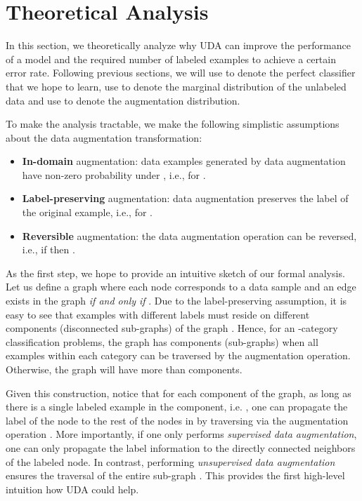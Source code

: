 \documentclass{article}
\def\name{UDA\xspace}
\begin{document}
\vspace{-0.5em}
\section{Theoretical Analysis}
\vspace{-0.5em}
\label{sec:theory}
In this section, we theoretically analyze why \name can improve the performance of a model and the required number of labeled examples to achieve a certain error rate.
Following previous sections, we will use  to denote the perfect classifier that we hope to learn, use  to denote the marginal distribution of the unlabeled data and use  to denote the augmentation distribution.

To make the analysis tractable, we make the following simplistic assumptions about the data augmentation transformation: 
\begin{itemize}[leftmargin=*,itemsep=0em,topsep=0em]
    \item \textbf{In-domain} augmentation: data examples generated by data augmentation have non-zero probability under , i.e.,  for .
    \item \textbf{Label-preserving} augmentation: data augmentation preserves the label of the original example, i.e.,  for .
    \item \textbf{Reversible} augmentation: the data augmentation operation can be reversed, i.e., if  then  .
\end{itemize}

As the first step, we hope to provide an intuitive sketch of our formal analysis.
Let us define a graph  where each node corresponds to a data sample  and an edge  exists in the graph \textit{if and only if} . 
Due to the label-preserving assumption, it is easy to see that examples with different labels must reside on different components (disconnected sub-graphs) of the graph .
Hence, for an -category classification problems, the graph has   components (sub-graphs) when all examples within each category can be traversed by the augmentation operation.
Otherwise, the graph will have more than  components.

Given this construction, notice that for each component  of the graph, as long as there is a single labeled example in the component, i.e. , one can propagate the label of the node to the rest of the nodes in  by traversing   via the augmentation operation .
More importantly, if one only performs \textit{supervised data augmentation}, one can only propagate the label information to the directly connected neighbors of the labeled node.
In contrast, performing \textit{unsupervised data augmentation} ensures the traversal of the entire sub-graph .
This provides the first high-level intuition how \name could  help.
\end{document}
